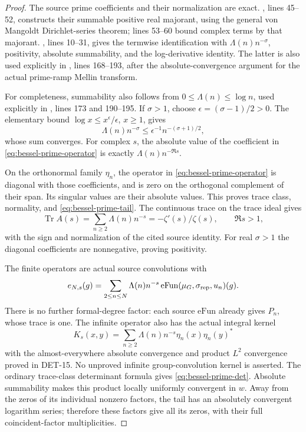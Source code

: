 \documentclass[11pt,a4paper]{article}
\newcommand{\Tr}{\operatorname{Tr}}
\newcommand{\fid}[1]{\textsf{#1}}
\begin{document}
\begin{proof}
The source prime coefficients and their normalization are exact.
,
lines 45--52, constructs their summable positive real majorant,
using the general von Mangoldt Dirichlet-series theorem; lines
53--60 bound complex terms by that majorant.
,
lines 10--31, gives the termwise identification with
\(\Lambda(n)n^{-\sigma}\), positivity, absolute summability,
and the log-derivative identity.  The latter is also used
explicitly in
,
lines 168--193, after the absolute-convergence argument for the
actual prime-ramp Mellin transform.

For completeness, summability also follows from
\(0\le\Lambda(n)\le\log n\), used explicitly in
,
lines 173 and 190--195.  If \(\sigma>1\), choose
\(\epsilon=(\sigma-1)/2>0\).  The elementary bound
\(\log x\le x^\epsilon/\epsilon\), \(x\ge1\), gives
\[
 \Lambda(n)n^{-\sigma}
 \le\epsilon^{-1}n^{-(\sigma+1)/2},
\]
whose sum converges.  For complex \(s\), the absolute value of
the coefficient in \eqref{eq:bessel-prime-operator} is exactly
\(\Lambda(n)n^{-\Re s}\).

On the orthonormal family \(\eta_n\), the operator in
\eqref{eq:bessel-prime-operator} is diagonal with those
coefficients, and is zero on the orthogonal complement of
their span.  Its singular values are their absolute values.
This proves trace class, normality, and
\eqref{eq:bessel-prime-tail}.  The continuous trace on the
trace ideal gives
\[
 \Tr A(s)=\sum_{n\ge2}\Lambda(n)n^{-s}
 =-\zeta'(s)/\zeta(s),\qquad \Re s>1,
\]
with the sign and normalization of the cited source identity.
For real \(\sigma>1\) the diagonal coefficients are
nonnegative, proving positivity.

The finite operators are actual source convolutions with
\[
 e_{N,s}(g)=
 \sum_{2\le n\le N}\Lambda(n)n^{-s}
 \,\mathrm{eFun}(\mu_G,\sigma_{\rm rep},u_n)(g).
\]
There is no further formal-degree factor: each source
\(\mathrm{eFun}\) already gives \(P_n\), whose trace is one.
The infinite operator also has the actual integral kernel
\[
 K_s(x,y)=\sum_{n\ge2}\Lambda(n)n^{-s}
                 \eta_n(x)\eta_n(y)^*
\]
with the almost-everywhere absolute convergence and product
\(L^2\) convergence proved in \fid{DET-15}.
No unproved infinite group-convolution kernel is asserted.
The ordinary trace-class determinant formula gives
\eqref{eq:bessel-prime-det}.  Absolute summability makes this
product locally uniformly convergent in \(w\).
Away from the zeros of its individual nonzero factors,
the tail has an absolutely convergent logarithm series;
therefore these factors give all its zeros, with their full
coincident-factor multiplicities.


\end{proof}
\end{document}
